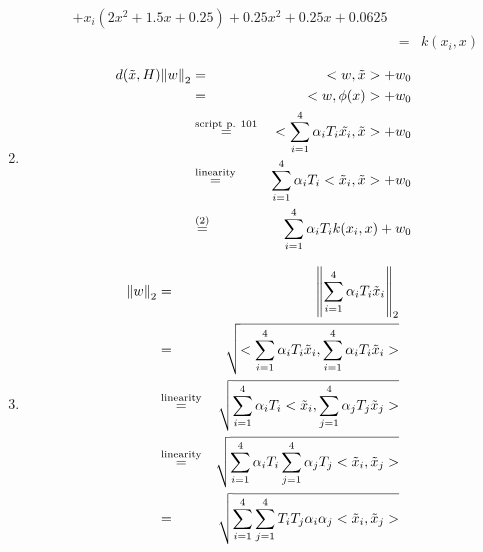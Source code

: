 \documentclass[DIN, pagenumber=false, fontsize=11pt, parskip=half]{scrartcl}
\begin{document}
\begin{enumerate}
\begin{enumerate}[label=\alph*)]
\begin{eqnarray*}
                                + x_i (2 x^2 + 1.5 x + 0.25)
                                + 0.25 x^2 + 0.25 x + 0.0625 \\
                            &=& k(x_i, x)
                    \end{eqnarray*}
            \end{enumerate}
            \setcounter{enumi}{5}
        \item
            \begin{eqnarray*}
                d(\tilde{x}, H) \norm{w}_2 &=& <w, \tilde{x}> + w_0 \\
                    &=& <w, \phi(x)> + w_0 \\
                    &\stackrel{\text{script p. 101}}{=}& <\sum_{i=1}^4 \alpha_i T_i \tilde{x_i}, \tilde{x}> + w_0 \\
                    &\stackrel{\text{linearity}}{=}& \sum_{i=1}^4 \alpha_i T_i <\tilde{x}_i, \tilde{x}> + w_0 \\
                    &\stackrel{\text{(2)}}{=}& \sum_{i=1}^4 \alpha_i T_i k(x_i,x) + w_0
            \end{eqnarray*}
        \item
            \begin{eqnarray*}
                \norm{w}_2 &=& \norm{\sum_{i=1}^4 \alpha_i T_i \tilde{x}_i}_2 \\
                    &=& \sqrt{<\sum_{i=1}^4 \alpha_i T_i \tilde{x}_i, \sum_{i=1}^4 \alpha_i T_i \tilde{x}_i>} \\
                    &\stackrel{\text{linearity}}{=}& \sqrt{\sum_{i=1}^4 \alpha_i T_i <\tilde{x}_i, \sum_{j=1}^4 \alpha_j T_j \tilde{x}_j>} \\
                    &\stackrel{\text{linearity}}{=}& \sqrt{\sum_{i=1}^4 \alpha_i T_i \sum_{j=1}^4 \alpha_j T_j <\tilde{x}_i, \tilde{x}_j>} \\
                    &=& \sqrt{\sum_{i=1}^4 \sum_{j=1}^4 T_i T_j \alpha_i \alpha_j <\tilde{x}_i, \tilde{x}_j>} \\
            \end{eqnarray*}
    \end{enumerate}
\end{document}
